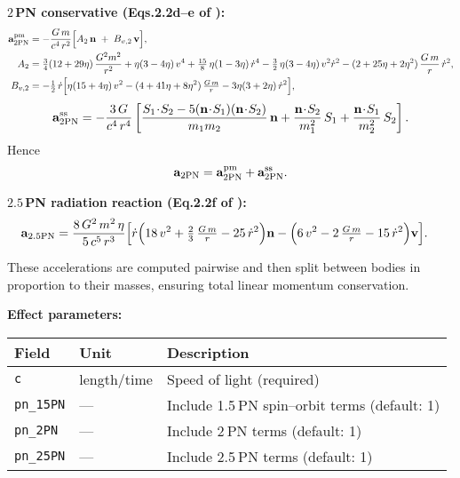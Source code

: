 \documentclass[11pt]{article}
\begin{document}
\medskip
\noindent\textbf{$2$\,PN conservative (Eqs.​2.2d–e of \citealp{Kidder1995}):}
\begin{align}
\mathbf{a}_{2\mathrm{PN}}^{\rm pm}
&= -\frac{G\,m}{c^4\,r^2}
   \Bigl[A_{2}\,\mathbf{n} \;+\; B_{v,2}\,\mathbf{v}\Bigr],\\
A_{2}
&= \tfrac{3}{4}(12+29\eta)\,\frac{G^2m^2}{r^2}
 +\eta(3-4\eta)\,v^4
 +\tfrac{15}{8}\,\eta(1-3\eta)\,\dot r^4
 -\tfrac{3}{2}\,\eta(3-4\eta)\,v^2\dot r^2
 -(2+25\eta+2\eta^2)\,\frac{G\,m}{r}\,\dot r^2,\\
B_{v,2}
&= -\tfrac{1}{2}\,\dot r
   \Bigl[\eta(15+4\eta)\,v^2
         -(4+41\eta+8\eta^2)\,\tfrac{G\,m}{r}
         -3\eta(3+2\eta)\,\dot r^2\Bigr],
\end{align}
\[
  \mathbf{a}_{2\mathrm{PN}}^{\rm ss}
  = -\frac{3\,G}{c^4\,r^4}
    \left[
      \frac{S_1\!\cdot\!S_2-5(\mathbf{n}\!\cdot\!S_1)(\mathbf{n}\!\cdot\!S_2)}{m_1 m_2}\,\mathbf{n}
     +\frac{\mathbf{n}\!\cdot\!S_2}{m_1^2}\,S_1
     +\frac{\mathbf{n}\!\cdot\!S_1}{m_2^2}\,S_2
    \right].
\]
Hence
\[
  \mathbf{a}_{2\mathrm{PN}}
  = \mathbf{a}_{2\mathrm{PN}}^{\rm pm}
  +\mathbf{a}_{2\mathrm{PN}}^{\rm ss}.
\]

\medskip
\noindent\textbf{$2.5$\,PN radiation reaction (Eq.​2.2f of \citealp{Kidder1995}):}
\begin{align}
\mathbf{a}_{2.5\mathrm{PN}}
&= \frac{8\,G^2\,m^2\,\eta}{5\,c^5\,r^3}
   \Bigl[
     \dot r\Bigl(18\,v^2 + \tfrac{2}{3}\,\tfrac{G\,m}{r} - 25\,\dot r^2\Bigr)\mathbf{n}
    -\Bigl(6\,v^2 - 2\,\tfrac{G\,m}{r} - 15\,\dot r^2\Bigr)\mathbf{v}
   \Bigr].
\end{align}

\medskip
\noindent
These accelerations are computed pairwise and then split between bodies
in proportion to their masses, ensuring total linear momentum conservation.

\bigskip
\noindent\textbf{Effect parameters:}
\begin{table}[h]
\centering\footnotesize
\begin{tabular}{@{}lll@{}}
\toprule
Field            & Unit             & Description                                \\
\midrule
\texttt{c}        & length/time      & Speed of light (required)                  \\
\texttt{pn\_15PN} & —                & Include 1.5 PN spin–orbit terms (default: 1)\\
\texttt{pn\_2PN}  & —                & Include 2 PN terms (default: 1)             \\
\texttt{pn\_25PN} & —                & Include 2.5 PN terms (default: 1)           \\
\bottomrule
\end{tabular}
\end{table}
\end{document}
